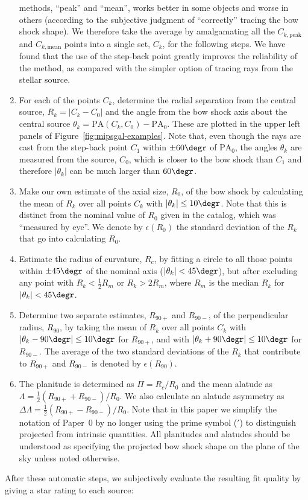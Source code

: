 \documentclass[useAMS, usenatbib, a4paper]{mnras}
\begin{document}
\begin{enumerate}[1.]
  methods, ``peak'' and ``mean'', works better in some objects and
  worse in others (according to the subjective judgment of
  ``correctly'' tracing the bow shock shape).  We therefore take the
  average by amalgamating all the \(C_{k,\text{peak}}\) and
  \(C_{k,\text{mean}}\) points into a single set, \(C_{k}\), for the
  following steps.  We have found that the use of the step-back point
  greatly improves the reliability of the method, as compared with the
  simpler option of tracing rays from the stellar source.
\item For each of the points \(C_{k}\), determine the radial
  separation from the central source, \(R_k = |C_k - C_0|\) and the
  angle from the bow shock axis about the central source
  \(\theta_k = \text{PA}(C_k, C_0) - \text{PA}_0\).  These are plotted in
  the upper left panels of Figure~\ref{fig:mipsgal-examples}.  Note
  that, even though the rays are cast from the step-back point \(C_1\)
  within \(\pm 60\degr\) of \(\text{PA}_0\), the angles \(\theta_k\) are
  measured from the source, \(C_0\), which is closer to the bow shock
  than \(C_1\) and therefore \(|\theta_k|\) can be much larger than
  \(60\degr\).
\item Make our own estimate of the axial size, \(R_0\), of the bow
  shock by calculating the mean of \(R_k\) over all points \(C_k\)
  with \(|\theta_k| \le 10\degr\).  Note that this is distinct from the
  nominal value of \(R_0\) given in the \citet{Kobulnicky:2016a}
  catalog, which was ``measured by eye''.  We denote by
  \(\epsilon(R_0)\) the standard deviation of the \(R_k\) that go into
  calculating \(R_0\).\label{step:R0}
\item Estimate the radius of curvature, \(R_c\), by fitting a circle
  to all those points within \(\pm 45\degr\) of the nominal axis
  (\(|\theta_k| < 45\degr\)), but after excluding any point with
  \(R_k < \frac12 R_m\) or \(R_k > 2 R_m\), where \(R_m\) is the median
  \(R_k\) for \(|\theta_k| < 45\degr\).\label{step:Rc}
\item Determine two separate estimates, \(R_{90+}\) and \(R_{90-}\),
  of the perpendicular radius, \(R_{90}\), by taking the mean of
  \(R_k\) over all points \(C_k\) with
  \(|\theta_k - 90\degr| \le 10\degr\) for \(R_{90+}\), and with
  \(|\theta_k + 90\degr| \le 10\degr\) for \(R_{90-}\).  The average of the
  two standard deviations of the \(R_k\) that contribute to
  \(R_{90+}\) and \(R_{90-}\) is denoted by \(\epsilon(R_{90})\).\label{step:R90}
\item The planitude is determined as \(\Pi = R_c / R_0\) and the mean
  alatude as \(\Lambda = \frac12 (R_{90+} + R_{90-}) / R_0\).  We also
  calculate an alatude asymmetry as
  \(\Delta\Lambda = \frac12 (R_{90+} - R_{90-}) / R_0\). Note that in this paper
  we simplify the notation of Paper~0 by no longer using the prime
  symbol (\('\)) to distinguish projected from intrinsic quantities.
  All planitudes and alatudes should be understood as specifying the
  projected bow shock shape on the plane of the sky unless noted
  otherwise.\label{step:Pi-Lambda}
\end{enumerate}
\label{sec:subj-eval-fit}
After these automatic steps, we subjectively evaluate the resulting
fit quality by giving a star rating to each source:
\end{document}
